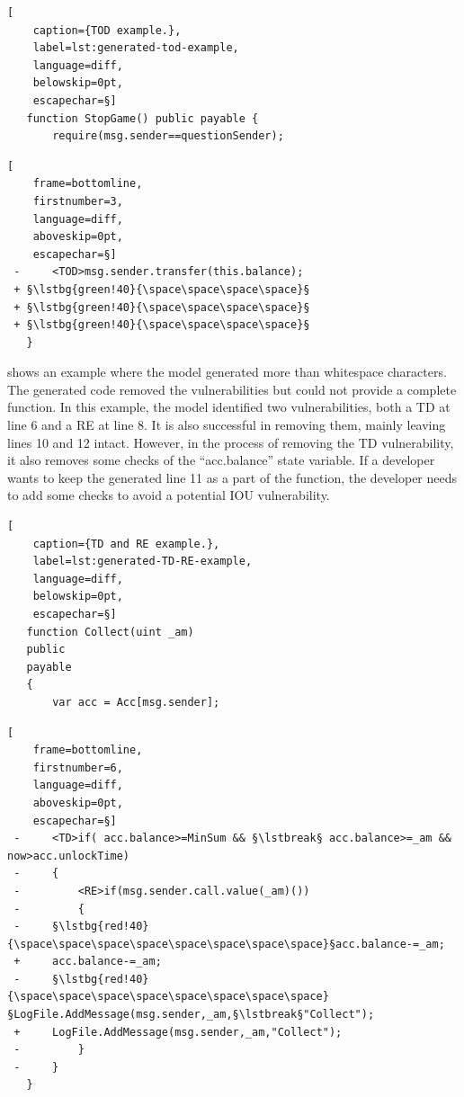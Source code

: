 \documentclass[12pt]{book}
\newcommand{\lstbg}[3][0pt]{{\fboxsep#1\colorbox{#2}{\strut #3}}}
\begin{document}
\newcommand{\lstbreak}{\break \raisebox{0ex}[0ex][0ex]{\ensuremath{\color{gray}\hookrightarrow\space}}}
\begin{lstlisting}[
    caption={TOD example.},
    label=lst:generated-tod-example,
    language=diff,
    belowskip=0pt,
    escapechar=§]
   function StopGame() public payable {
       require(msg.sender==questionSender);
\end{lstlisting}
\begin{lstlisting}[
    frame=bottomline,
    firstnumber=3,
    language=diff,
    aboveskip=0pt,
    escapechar=§]
 -     <TOD>msg.sender.transfer(this.balance);
 + §\lstbg{green!40}{\space\space\space\space}§
 + §\lstbg{green!40}{\space\space\space\space}§
 + §\lstbg{green!40}{\space\space\space\space}§
   }
\end{lstlisting}

 shows an example where the model generated more than whitespace characters. The generated code removed the vulnerabilities but could not provide a complete function. In this example, the model identified two vulnerabilities, both a TD at line 6 and a RE at line 8. It is also successful in removing them, mainly leaving lines 10 and 12 intact. However, in the process of removing the TD vulnerability, it also removes some checks of the ``acc.balance'' state variable. If a developer wants to keep the generated line 11 as a part of the function, the developer needs to add some checks to avoid a potential IOU vulnerability.  

\begin{lstlisting}[
    caption={TD and RE example.},
    label=lst:generated-TD-RE-example,
    language=diff,
    belowskip=0pt,
    escapechar=§]
   function Collect(uint _am)
   public
   payable
   {
       var acc = Acc[msg.sender];
\end{lstlisting}
\begin{lstlisting}[
    frame=bottomline,
    firstnumber=6,
    language=diff,
    aboveskip=0pt,
    escapechar=§]
 -     <TD>if( acc.balance>=MinSum && §\lstbreak§ acc.balance>=_am && now>acc.unlockTime)
 -     {
 -         <RE>if(msg.sender.call.value(_am)())
 -         {
 -     §\lstbg{red!40}{\space\space\space\space\space\space\space\space}§acc.balance-=_am;
 +     acc.balance-=_am;
 -     §\lstbg{red!40}{\space\space\space\space\space\space\space\space}§LogFile.AddMessage(msg.sender,_am,§\lstbreak§"Collect");
 +     LogFile.AddMessage(msg.sender,_am,"Collect");
 -         }
 -     }
   }
\end{lstlisting}
\end{document}
